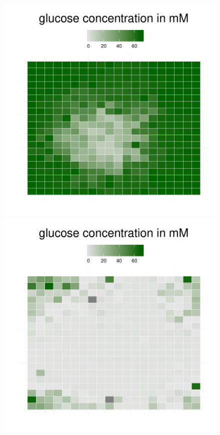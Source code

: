 \begin{figure}[h!]
{\begin{minipage}[t]{0.3\textwidth}
  \end{minipage}
  \begin{minipage}[t]{0.3\textwidth}
    \includegraphics[width=\textwidth]{../results/Bcoli_20x20_seed176_glucose15.pdf}
  \end{minipage}
  \begin{minipage}[t]{0.3\textwidth}
    \includegraphics[width=\textwidth]{../results/Bcoli_20x20_seed176_glucose35a.pdf}

\end{minipage}}
\end{figure}
